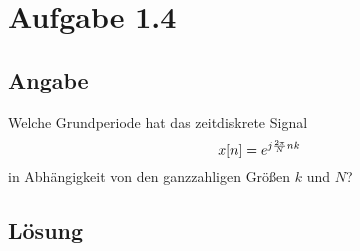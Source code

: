 \section*{Aufgabe 1.4}

\subsection*{Angabe}
 
Welche Grundperiode hat das zeitdiskrete Signal
\[
	x\negthinspace\left[n\right]=e^{j\frac{2\pi}{N}nk}
\]
in Abhängigkeit von den ganzzahligen Größen $k$ und $N$?

\subsection*{Lösung}